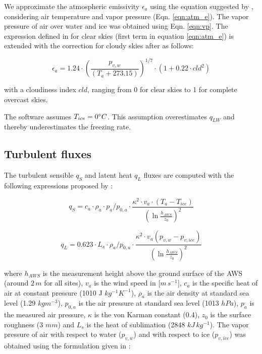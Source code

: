 \documentclass[utf8]{frontiersSCNS}
\begin{document}
We approximate the atmospheric emissivity $\epsilon_a$ using the equation suggested by \cite{Brutsaert_1975},
considering air temperature and vapor pressure (Eqn. \ref{eqn:atm_e}). The vapor pressure of air over water and
ice was obtained using Eqn. \ref{eqn:vp}.  The expression defined in \cite{Brutsaert_1975} for clear skies
(first term in equation \ref{eqn:atm_e}) is extended with the correction for cloudy skies after
\cite{Brutsaert_1982} as follows:

\begin{equation}
	\epsilon_a=1.24 \cdot (\frac{p_{v,w}}{(T_a+273.15)})^{1/7}\cdot(1+0.22\cdot{cld}^2) \label{eqn:atm_e}
\end{equation}

with a cloudiness index $cld$, ranging from 0 for clear skies to 1 for complete overcast skies. 

The software assumes $T_{ice} = 0 \degree C$. This assumption overestimates $q_{LW}$ and thereby underestimates
the freezing rate.

\subsection{Turbulent fluxes} \label{sec:Qs}

The turbulent sensible $q_{S}$ and latent heat $q_{L}$ fluxes are computed with the following expressions
proposed by \cite{Garratt_1992}:

\begin{equation}
	q_{S}= c_{a} \cdot \rho_{a} \cdot p_{a}/p_{0,a} \cdot \frac{\kappa^2 \cdot v_a \cdot
		(T_a-T_{ice})}{{(\ln{\frac{h_{AWS}}{z_{0}}})}^2}
	\label{eqn:qs}
\end{equation}

\begin{equation}
	q_{L}= 0.623 \cdot L_s \cdot \rho_{a}/p_{0,a} \cdot \frac{\kappa^2 \cdot
	v_a(p_{v,w}-p_{v,ice})}{{(\ln{\frac{h_{AWS}}{z_{0}}})}^2}
\end{equation}

where $h_{AWS}$ is the measurement height above the ground surface of the AWS (around $2\,m$ for all sites),
$v_a$ is the wind speed in [$m\,s^{-1}$], $c_a$ is the specific heat of air at constant pressure (1010 J
$kg^{-1} K^{-1}$), $\rho_{a}$ is the air density at standard sea level (1.29 $kg m^{-3}$), $p_{0,a}$ is the air
pressure at standard sea level (1013 $hPa$), $p_{a}$ is the measured air pressure, $\kappa$ is the von Karman
constant (0.4), $z_{0}$ is the surface roughness (3 $mm$) and $L_s$ is the heat of sublimation (2848
$kJ\,kg^{-1}$).  The vapor pressure of air with respect to water ($p_{v,w}$) and with respect to ice
($p_{v,ice}$) was obtained using the formulation given in \cite{huang_2018} :
\end{document}
